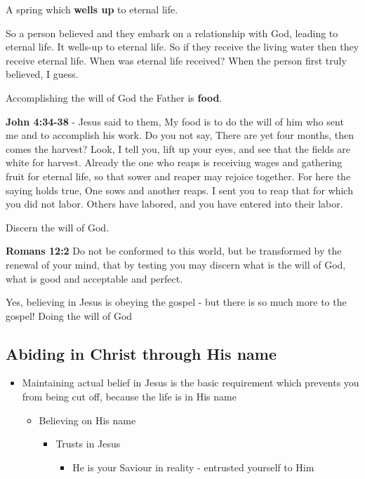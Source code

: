 \documentclass[11pt]{article}
\begin{document}
A spring which \textbf{wells up} to eternal life.

So a person believed and they embark on a relationship with God, leading to eternal life.
It wells-up to eternal life. So if they receive the living water then they receive eternal life.
When was eternal life received? When the person first truly believed, I guess.

Accomplishing the will of God the Father is \textbf{food}.

\textbf{John 4:34-38} - Jesus said to them, My food is to do the will of him who sent me and to accomplish his work.  Do you not say, There are yet four months, then comes the harvest? Look, I tell you, lift up your eyes, and see that the fields are white for harvest.  Already the one who reaps is receiving wages and gathering fruit for eternal life, so that sower and reaper may rejoice together.  For here the saying holds true, One sows and another reaps.  I sent you to reap that for which you did not labor. Others have labored, and you have entered into their labor.

Discern the will of God.

\textbf{Romans 12:2} Do not be conformed to this world, but be transformed by the renewal of your mind, that by testing you may discern what is the will of God, what is good and acceptable and perfect.

Yes, believing in Jesus is obeying the gospel - but there is so much more to the gospel! Doing the will of God

\subsection{Abiding in Christ through His name}
\label{sec:org44ce351}
\begin{itemize}
\item Maintaining actual belief in Jesus is the basic requirement which prevents you from being cut off, because the life is in His name
\begin{itemize}
\item Believing on His name
\begin{itemize}
\item Trusts in Jesus
\begin{itemize}
\item He is your Saviour in reality - entrusted yourself to Him
\end{itemize}
\end{itemize}
\end{itemize}
\end{itemize}
\end{document}
